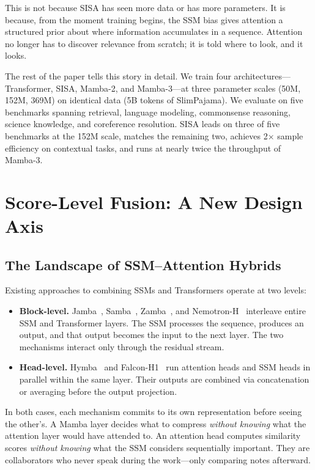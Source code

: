 \documentclass[11pt]{article}
\begin{document}
This is not because SISA has seen more data or has more parameters. It is because, from the moment training begins, the SSM bias gives attention a structured prior about where information accumulates in a sequence. Attention no longer has to discover relevance from scratch; it is told where to look, and it looks.

The rest of the paper tells this story in detail. We train four architectures---Transformer, SISA, Mamba-2, and Mamba-3---at three parameter scales (50M, 152M, 369M) on identical data (5B tokens of SlimPajama). We evaluate on five benchmarks spanning retrieval, language modeling, commonsense reasoning, science knowledge, and coreference resolution. SISA leads on three of five benchmarks at the 152M scale, matches the remaining two, achieves 2$\times$ sample efficiency on contextual tasks, and runs at nearly twice the throughput of Mamba-3.

\section{Score-Level Fusion: A New Design Axis}

\subsection{The Landscape of SSM--Attention Hybrids}

Existing approaches to combining SSMs and Transformers operate at two levels:

\begin{itemize}
\item \textbf{Block-level.} Jamba~\citep{jamba}, Samba~\citep{samba}, Zamba~\citep{zamba}, and Nemotron-H~\citep{nemotron} interleave entire SSM and Transformer layers. The SSM processes the sequence, produces an output, and that output becomes the input to the next layer. The two mechanisms interact only through the residual stream.

\item \textbf{Head-level.} Hymba~\citep{hymba} and Falcon-H1~\citep{falconh1} run attention heads and SSM heads in parallel within the same layer. Their outputs are combined via concatenation or averaging before the output projection.
\end{itemize}

In both cases, each mechanism commits to its own representation before seeing the other's. A Mamba layer decides what to compress \emph{without knowing} what the attention layer would have attended to. An attention head computes similarity scores \emph{without knowing} what the SSM considers sequentially important. They are collaborators who never speak during the work---only comparing notes afterward.
\end{document}
